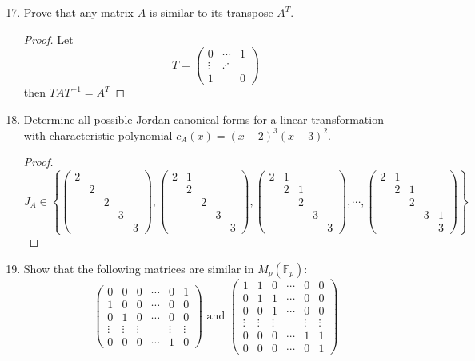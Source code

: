 \documentclass{report}
\newcommand{\F}{\mathbb{F}}
\begin{document}
\begin{enumerate}
		\setcounter{enumi}{16}
	\item Prove that any matrix $A$ is similar to its transpose $A^T$.
		\begin{proof}
			Let 
			$$T=\begin{pmatrix}0&\cdots&1\\\vdots&\iddots\\1&&0\end{pmatrix}$$ 
			then $TAT^{-1}=A^T$
		\end{proof}
	\item Determine all possible Jordan canonical forms for a linear transformation with characteristic polynomial $c_A(x)=(x-2)^3(x-3)^2$.
		\begin{proof}
			$$J_A\in\left\{\begin{pmatrix}2\\&2\\&&2\\&&&3\\&&&&3\end{pmatrix},
				\begin{pmatrix}2&1\\&2\\&&2\\&&&3\\&&&&3\end{pmatrix},
				\begin{pmatrix}2&1\\&2&1\\&&2\\&&&3\\&&&&3\end{pmatrix}, \cdots,
				\begin{pmatrix}2&1\\&2&1\\&&2\\&&&3&1\\&&&&3\end{pmatrix}
			\right\}$$ 
		\end{proof}
		\setcounter{enumi}{19}
	\item Show that the following matrices are similar in $M_p (\F_p)$:
		$$\begin{pmatrix}0&0&0&\cdots&0&1\\1&0&0&\cdots&0&0\\0&1&0&\cdots&0&0\\\vdots&\vdots&\vdots&&\vdots&\vdots\\0&0&0&\cdots&1&0\end{pmatrix}\text{ and }
		\begin{pmatrix}1&1&0&\cdots&0&0\\0&1&1&\cdots&0&0\\0&0&1&\cdots&0&0\\\vdots&\vdots&\vdots&&\vdots&\vdots\\0&0&0&\cdots&1&1\\0&0&0&\cdots&0&1\end{pmatrix}$$

\end{enumerate}
\end{document}
